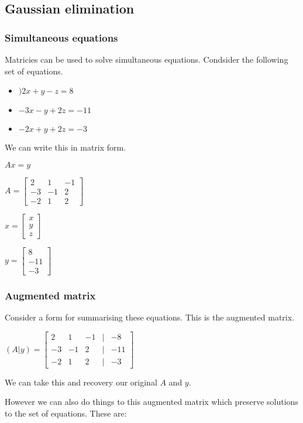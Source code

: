 
\subsection{Gaussian elimination}

\subsubsection{Simultaneous equations}

Matricies can be used to solve simultaneous equations. Condsider the following set of equations.

\begin{itemize}
\item \()2x+y-z=8\)
\item \(-3x-y+2z=-11\)
\item \(-2x+y+2z=-3\)
\end{itemize}

We can write this in matrix form.

\(Ax=y\)

\(A=\begin{bmatrix}2 & 1&-1\\-3 & -1&2\\-2&1&2\end{bmatrix}\)

\(x=\begin{bmatrix}x \\y \\z\end{bmatrix}\)

\(y=\begin{bmatrix}8 \\-11 \\-3\end{bmatrix}\)

\subsubsection{Augmented matrix}

Consider a form for summarising these equations. This is the augmented matrix.

\((A|y)=\begin{bmatrix}2 & 1&-1&|&-8\\-3 & -1&2&|&-11\\-2&1&2&|&-3\end{bmatrix}\)

We can take this and recovery our original \(A\) and \(y\).

However we can also do things to this augmented matrix which preserve solutions to the set of equations. These are:

